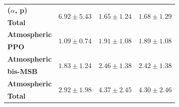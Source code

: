 \begin{table}
\begin{tabular}{lccc}
        \textbf{($\alpha$, p)} & \multirow{2}{*}{$6.92\pm5.43$} & \multirow{2}{*}{$1.65\pm1.24$} & \multirow{2}{*}{$1.68\pm1.29$} \\
        \textbf{Total} & & & \\
        \hline

        \textbf{Atmospheric} & \multirow{2}{*}{$1.09\pm0.74$} & \multirow{2}{*}{$1.91\pm1.08$} & \multirow{2}{*}{$1.89\pm1.08$} \\
        \textbf{PPO} & & & \\
        \hline

        \textbf{Atmospheric} & \multirow{2}{*}{$1.83\pm1.24$} & \multirow{2}{*}{$2.46\pm1.38$} & \multirow{2}{*}{$2.42\pm1.38$} \\
        \textbf{bis-MSB} & & & \\
        \hline

        \textbf{Atmospheric} & \multirow{2}{*}{$2.92\pm1.98$} & \multirow{2}{*}{$4.37\pm2.45$} & \multirow{2}{*}{$4.30\pm2.46$} \\
        \textbf{Total} & & & \\
        \hline

        \hline\hline
    \end{tabular}
\end{table}


